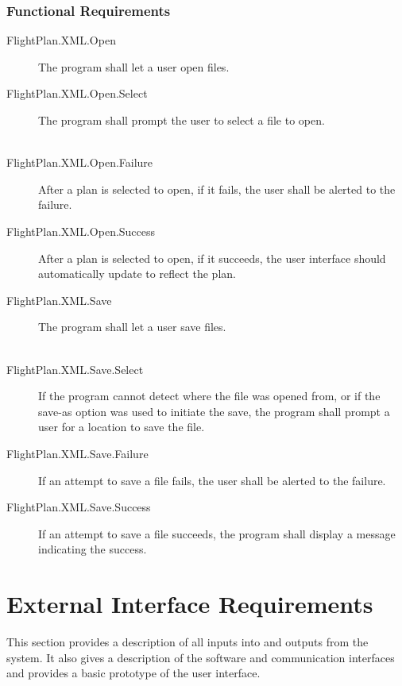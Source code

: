 \documentclass[12pt, letterpaper]{article}
\begin{document}
          \subsubsection{Functional Requirements}
            \begin{description}
              \item[FlightPlan.XML.Open] The program shall let a user open files. \\
              \item[FlightPlan.XML.Open.Select] The program shall prompt the user to select a file to open. \\ \
              \item[FlightPlan.XML.Open.Failure] After a plan is selected to open, if it fails, the user shall be alerted to the failure. \\
              \item[FlightPlan.XML.Open.Success] After a plan is selected to open, if it succeeds, the user interface should automatically update to reflect the plan. \\
              \item[FlightPlan.XML.Save] The program shall let a user save files. \\ \
              \item[FlightPlan.XML.Save.Select] If the program cannot detect where the file was opened from,
                         or if the save-as option was used to initiate the save, the program shall prompt a user for a location to save the file. \\
              \item[ FlightPlan.XML.Save.Failure] If an attempt to save a file fails, the user shall be alerted to the failure. \\
              \item[FlightPlan.XML.Save.Success] If an attempt to save a file succeeds, the program shall display a message indicating the success. \\
            \end{description}
          \newpage
\section{External Interface Requirements}
  This section provides a description of all inputs into and outputs from the system.
  It also gives a description of the software and communication interfaces and provides a basic prototype of the user interface.
\end{document}
